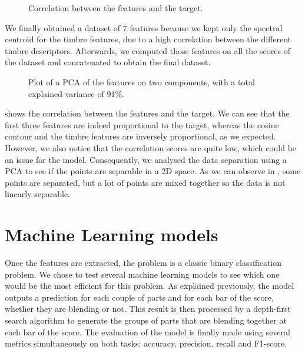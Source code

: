 \documentclass{article}
\begin{document}
\begin{figure}[ht]
	\centerline{}
	\caption{Correlation between the features and the target.}
	\label{fig:correlation}
\end{figure}

We finally obtained a dataset of 7 features because we kept only the spectral centroid for the timbre features, due to a high correlation between the different timbre descriptors.
Afterwards, we computed those features on all the scores of the dataset and concatenated to obtain the final dataset.



\begin{figure}[ht]
  \centerline{}
  \caption{Plot of a PCA of the features on two components, with a total explained variance of 91\%.}
  \label{fig:pca}
\end{figure}

 shows the correlation between the features and the target. 
We can see that the first three features are indeed proportional to the target, whereas the cosine contour and the timbre features are inversely proportional, as we expected.
However, we also notice that the correlation scores are quite low, which could be an issue for the model.
Consequently, we analysed the data separation using a PCA to see if the points are separable in a 2D space.
As we can observe in , some points are separated, but a lot of points are mixed together so the data is not linearly separable.


\section{Machine Learning models}\label{sec:ml_model}


Once the features are extracted, the problem is a classic binary classification problem.
We chose to test several machine learning models to see which one would be the most efficient for this problem.
As explained previously, the model outputs a prediction for each couple of parts and for each bar of the score, whether they are blending or not.
This result is then processed by a depth-first search algorithm to generate the groups of parts that are blending together at each bar of the score.
The evaluation of the model is finally made using several metrics simultaneously on both tasks: accuracy, precision, recall and F1-score.
\end{document}
